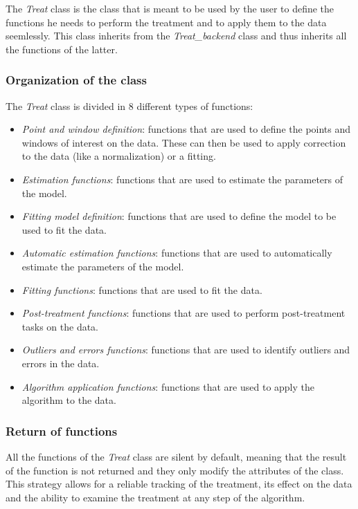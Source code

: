 The \textit{Treat} class is the class that is meant to be used by the user to define the functions he needs to perform the treatment and to apply them to the data seemlessly. This class inherits from the \textit{Treat\_backend} class and thus inherits all the functions of the latter.

\subsubsection{Organization of the class}

The \textit{Treat} class is divided in 8 different types of functions:
\begin{itemize}
    \item \textit{Point and window definition}: functions that are used to define the points and windows of interest on the data. These can then be used to apply correction to the data (like a normalization) or a fitting.
    \item \textit{Estimation functions}: functions that are used to estimate the parameters of the model.
    \item \textit{Fitting model definition}: functions that are used to define the model to be used to fit the data.
    \item \textit{Automatic estimation functions}: functions that are used to automatically estimate the parameters of the model.
    \item \textit{Fitting functions}: functions that are used to fit the data.
    \item \textit{Post-treatment functions}: functions that are used to perform post-treatment tasks on the data.
    \item \textit{Outliers and errors functions}: functions that are used to identify outliers and errors in the data.
    \item \textit{Algorithm application functions}: functions that are used to apply the algorithm to the data.
\end{itemize}

\subsubsection{Return of functions}

All the functions of the \textit{Treat} class are silent by default, meaning that the result of the function is not returned and they only modify the attributes of the class. This strategy allows for a reliable tracking of the treatment, its effect on the data and the ability to examine the treatment at any step of the algorithm.

